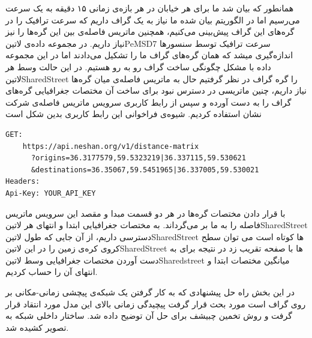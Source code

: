 
همانطور که بیان شد ما برای هر خیابان در هر بازه‌ی زمانی ۱۵ دقیقه به یک سرعت می‌رسیم اما در الگوریتم بیان شده ما نیاز به یک گراف داریم که سرعت ترافیک را در گره‌های این گراف پیش‌بینی می‌کنیم، همچنین ماتریس فاصله‌ی بین این گره‌ها را نیز نیاز داریم. در مجموعه داده‌ی ‌لاتین{PeMSD7} سرعت ترافیک توسط سنسورها اندازه‌گیری میشد که همان گره‌های گراف ما را تشکیل می‌دادند اما در این مجموعه داده با مشکل چگونگی ساخت گراف رو به رو هستیم. در این حالت وسط هر ‌لاتین{SharedStreet} را گره گراف در نظر گرفتیم حال به ماتریس فاصله‌ی میان گره‌ها نیاز داریم، چنین ماتریسی در دسترس نبود برای ساخت آن مختصات جغرافیایی گره‌های گراف را به دست آورده و سپس از رابط کاربری سرویس ماتریس فاصله‌ی شرکت نشان استفاده کردیم. شیوه‌ی فراخوانی این رابط کاربری بدین شکل است

\begin{latin}\begin{lstlisting}
GET:
    https://api.neshan.org/v1/distance-matrix
      ?origins=36.3177579,59.5323219|36.337115,59.530621
      &destinations=36.35067,59.5451965|36.337005,59.530021
Headers:
Api-Key: YOUR_API_KEY
\end{lstlisting}\end{latin}

با قرار دادن مختصات گره‌ها در هر دو قسمت مبدا و مقصد این سرویس ماتریس فاصله را به ما بر می‌گرداند. به مختصات جغرافیایی ابتدا و انتهای هر ‌لاتین{SharedStreet} دسترسی داریم، از آن جایی که طول ‌لاتین{SharedStreet} ها کوتاه است می توان سطح کروی کره‌ی زمین را در این ‌لاتین{SharedStreet} ها با صفحه تقریب زد در نتیجه برای به دست آوردن مختصات جغرافیایی وسط ‌لاتین{Sharedstreet} میانگین مختصات ابتدا و انتهای آن را حساب کردیم.

در این بخش راه حل پیشنهادی که به کار گرفتن یک شبکه‌ی پیچشی زمانی-مکانی بر روی گراف است مورد بحث قرار گرفت پیچیدگی زمانی بالای این مدل مورد انتقاد قرار گرفت و روش تخمین چبیشف برای حل آن توضیح داده شد. ساختار داخلی شبکه به تصویر کشیده شد.
